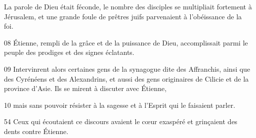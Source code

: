 La parole de Dieu était féconde, le nombre des disciples se multipliait fortement à Jérusalem, et une grande foule de prêtres juifs parvenaient à l’obéissance de la foi.

08 Étienne, rempli de la grâce et de la puissance de Dieu, accomplissait parmi le peuple des prodiges et des signes éclatants.

09 Intervinrent alors certaines gens de la synagogue dite des Affranchis, ainsi que des Cyrénéens et des Alexandrins, et aussi des gens originaires de Cilicie et de la province d’Asie. Ils se mirent à discuter avec Étienne,

10 mais sans pouvoir résister à la sagesse et à l’Esprit qui le faisaient parler.

54 Ceux qui écoutaient ce discours avaient le cœur exaspéré et grinçaient des dents contre Étienne.

